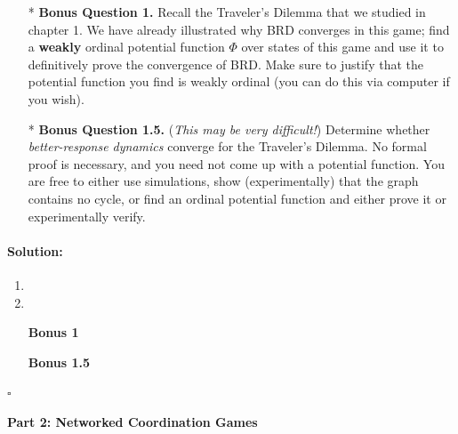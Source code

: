 \documentclass[11pt,letterpaper]{article}
\newif \iftemplate \templatetrue
\newenvironment{solution}{\paragraph{Solution:}}{\hfill$\square$}
\theoremstyle{definition}
\begin{document}
\begin{enumerate}
\item[*] \textbf{Bonus Question 1.} Recall the Traveler's Dilemma that we studied in chapter 1. We have already illustrated why BRD converges in this game; find a \textbf{weakly} ordinal potential function $\Phi$ over states of this game and use it to definitively prove the convergence of BRD. Make sure to justify that the potential function you find is weakly ordinal (you can do this via computer if you wish).

\item[*] \textbf{Bonus Question 1.5.} (\emph{This may be very difficult!}) Determine whether \emph{better-response dynamics} converge for the Traveler's Dilemma. No formal proof is necessary, and you need not come up with a potential function. You are free to either use simulations, show (experimentally) that the graph contains no cycle, or find an ordinal potential function and either prove it or experimentally verify.
\end{enumerate}

\iftemplate
\begin{solution}
\begin{enumerate}[label=(\alph*)]
\item 
\item 
\item[\textbf{Bonus 1}]
\item[\textbf{Bonus 1.5}]
\end{enumerate}
\end{solution}
\newpage
\fi


\noindent
{\Large\textbf{Part 2: Networked Coordination Games}\par}
\end{document}
